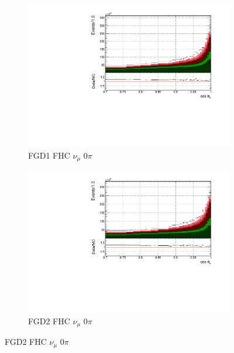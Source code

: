 \begin{figure}[!htbp]
\begin{subfigure}{0.49\textwidth}
  \centering
  \includegraphics[width=\textwidth]{figs/FGD1_numuCC_0pi_t}
  \caption{FGD1 FHC $\nu_{\mu}$ 0$\pi$}
\end{subfigure}
\begin{subfigure}{0.49\textwidth}
  \centering
  \includegraphics[width=\textwidth]{figs/FGD2_numuCC_0pi_t}
  \caption{FGD2 FHC $\nu_{\mu}$ 0$\pi$}
\end{subfigure}


\end{figure}
